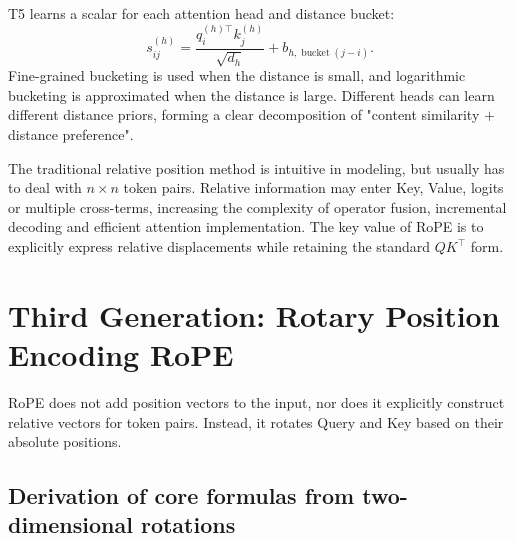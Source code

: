 \documentclass[UTF8,fontset=none,a4paper,10pt]{ctexart}
\begin{document}
T5 learns a scalar \cite{en:raffel2020} for each attention head and distance bucket:
\begin{equation}
  s_{ij}^{(h)}=
  \frac{q_i^{(h)\top}k_j^{(h)}}{\sqrt{d_h}}
  +b_{h,\operatorname{bucket}(j-i)}.
  \label{en:eq:t5-bias}
\end{equation}
Fine-grained bucketing is used when the distance is small, and logarithmic bucketing is approximated when the distance is large. Different heads can learn different distance priors, forming a clear decomposition of "content similarity $+$ distance preference".

The traditional relative position method is intuitive in modeling, but usually has to deal with $n\times n$ token pairs. Relative information may enter Key, Value, logits or multiple cross-terms, increasing the complexity of operator fusion, incremental decoding and efficient attention implementation. The key value of RoPE is to explicitly express relative displacements while retaining the standard $QK^\top$ form.

\section{Third Generation: Rotary Position Encoding RoPE}

RoPE does not add position vectors to the input, nor does it explicitly construct relative vectors for token pairs. Instead, it rotates Query and Key\cite{en:su2021} based on their absolute positions.

\subsection{Derivation of core formulas from two-dimensional rotations}
\end{document}
